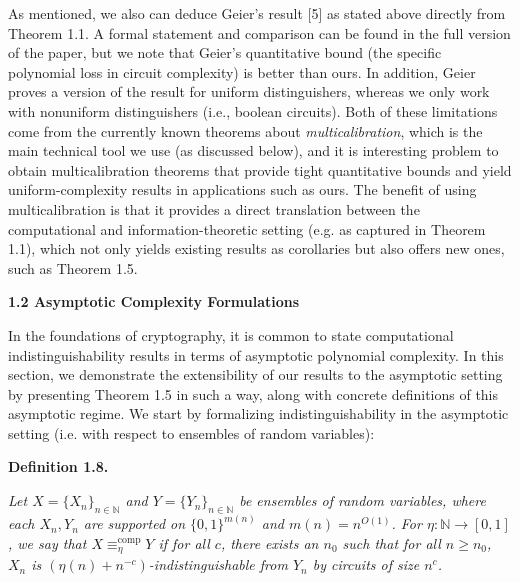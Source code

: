 As mentioned, we also can deduce Geier’s result [5] as stated above directly from Theorem 1.1. A formal statement and comparison can be found in the full version of the paper, but we note that Geier’s quantitative bound (the specific polynomial loss in circuit complexity) is better than ours. In addition, Geier proves a version of the result for uniform distinguishers, whereas we only work with nonuniform distinguishers (i.e., boolean circuits). Both of these limitations come from the currently known theorems about \emph{multicalibration}, which is the main technical tool we use (as discussed below), and it is interesting problem to obtain multicalibration theorems that provide tight quantitative bounds and yield uniform-complexity results in applications such as ours. The benefit of using multicalibration is that it provides a direct translation between the computational and information-theoretic setting (e.g. as captured in Theorem 1.1), which not only yields existing results as corollaries but also offers new ones, such as Theorem 1.5.\par





\par\medskip\noindent\textbf{
1.2 Asymptotic Complexity Formulations}\par




In the foundations of cryptography, it is common to state computational indistinguishability results in terms of asymptotic polynomial complexity.
In this section, we demonstrate the extensibility of our results to the asymptotic setting by presenting Theorem 1.5 in such a way, along with concrete definitions of this asymptotic regime. We start by formalizing indistinguishability in the asymptotic setting (i.e. with respect to ensembles of random variables):\par





\par\medskip\noindent\textbf{
\textbf{Definition 1.8}\textbf{.}
}\par



\emph{Let $X=\{X_{n}\}_{n\in\mathbb{N}}$ and $Y=\{Y_{n}\}_{n\in\mathbb{N}}$ be ensembles of random variables, where each $X_{n},Y_{n}$ are supported on $\{0,1\}^{m(n)}$ and $m(n)=n^{O(1)}$. For $\eta:\mathbb{N}\rightarrow[0,1]$, we say that $X\equiv_{\eta}^{\mathrm{comp}}Y$ if for all $c$, there exists an $n_{0}$ such that for all $n\geq n_{0}$, $X_{n}$ is $(\eta(n)+n^{-c})$-indistinguishable from $Y_{n}$ by circuits of size $n^{c}$.}\par




